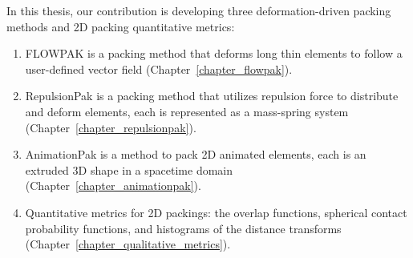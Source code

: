 In this thesis, 
our contribution is developing three deformation-driven packing methods and 2D packing quantitative metrics:
\begin{enumerate}
\item FLOWPAK is a packing method that deforms long thin elements to follow a user-defined vector field (Chapter~\ref{chapter_flowpak}).
\item RepulsionPak is a packing method that utilizes repulsion force to distribute and deform elements,
	each is represented as a mass-spring system (Chapter~\ref{chapter_repulsionpak}).
\item AnimationPak is a method to pack 2D animated elements, each is an extruded 3D shape
	in a spacetime domain (Chapter~\ref{chapter_animationpak}). 
\item  Quantitative metrics for 2D packings: the overlap functions, spherical contact probability functions,
and histograms of the distance transforms (Chapter~\ref{chapter_qualitative_metrics}). 
\end{enumerate}







